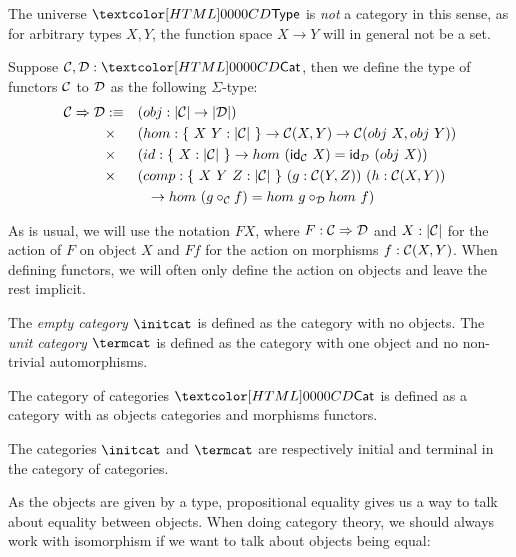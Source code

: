 \begin{remark}
  The universe $\Type$ is \emph{not} a category in this sense, as for
  arbitrary types $X, Y$, the function space $X \to Y$ will in general
  not be a set.
\end{remark}

\begin{definition}[Functor]
  Suppose $\Cc, \Dd : \Cat$, then we define the type of functors $\mathcal{C}$
  to $\mathcal{D}$ as the following $\Sigma$-type:
  \begin{align*}
    \Func{\Cc}{\Dd} &\ddefeq &&(obj : | \Cc | \to | \Dd |) \\
    &\times &&(hom : \{\ X\ Y : | \Cc |\ \} \to \Cc(X,Y) \to \Cc(obj\ X, obj\ Y)) \\
    &\times &&(id : \{\ X : | \Cc |\ \} \to hom\ (\id_{\Cc}\ X) = \id_{\Dd}\ (obj\ X)) \\
    &\times &&(comp : \{\ X\ Y\ Z : | \Cc |\ \}\ (g : \Cc(Y,Z))\ (h : \Cc(X,Y)) \\
    &&&\ \ \to hom\ (g \circ_{\Cc} f) = hom\ g \circ_{\Dd} hom\ f)
  \end{align*}
\end{definition}

As is usual, we will use the notation $F X$, where
$F : \mathcal{C} \Rightarrow \mathcal{D}$ and $X : | \mathcal{C} |$ for the action of $F$ on
object $X$ and $F f$ for the action on morphisms $f : \mathcal{C}(X,Y)$. When
defining functors, we will often only define the action on objects and
leave the rest implicit.

\begin{definition}
  The \emph{empty category} $\initcat$ is defined as the category with
  no objects. The \emph{unit category} $\termcat$ is defined as the
  category with one object and no non-trivial automorphisms.
\end{definition}

\begin{definition}
  The category of categories $\Cat$ is defined as a category with as
  objects categories and morphisms functors.
\end{definition}

The categories $\initcat$ and $\termcat$ are respectively initial and
terminal in the category of categories.

As the objects are given by a type, propositional equality gives us a
way to talk about equality between objects. When doing category
theory, we should always work with isomorphism if we want to talk
about objects being equal:

